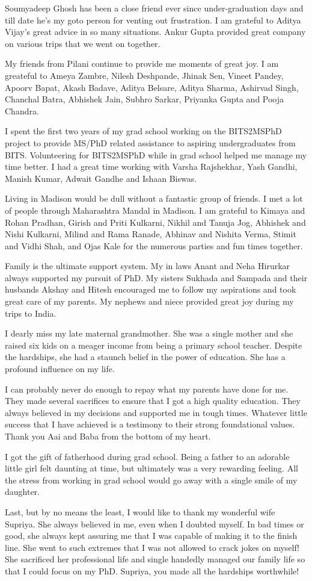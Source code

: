 Soumyadeep Ghosh has been a close friend ever since under-graduation days and till date he's my goto person for venting out frustration. 
I am grateful to Aditya Vijay's great advice in so many situations.
Ankur Gupta provided great company on various trips that we went on together.

My friends from Pilani continue to provide me moments of great joy.
I am greateful to Ameya Zambre, Nilesh Deshpande, Jhinak Sen, Vineet Pandey, Apoorv Bapat, Akash Badave, Aditya Belsare, Aditya Sharma, Ashirvad Singh, Chanchal Batra, Abhishek Jain, Subhro Sarkar, Priyanka Gupta and Pooja Chandra.

I spent the first two years of my grad school working on the BITS2MSPhD project to provide MS/PhD related assistance to aspiring undergraduates from BITS. 
Volunteering for BITS2MSPhD while in grad school helped me manage my time better.
I had a great time working with Varsha Rajshekhar, Yash Gandhi, Manish Kumar, Adwait Gandhe and Ishaan Biswas. 

Living in Madison would be dull without a fantastic group of friends.
I met a lot of people through Maharashtra Mandal in Madison. 
I am grateful to Kimaya and Rohan Pradhan, Girish and Priti Kulkarni, Nikhil and Tanuja Jog, Abhishek and Nishi Kulkarni, Milind and Rama Ranade, Abhinav and Nishita Verma, Stimit and Vidhi Shah, and Ojas Kale for the numerous parties and fun times together. 

Family is the ultimate support system. 
My in laws Anant and Neha Hirurkar always supported my pursuit of PhD. 
My sisters Sukhada and Sampada and their husbands Akshay and Hitesh encouraged me to follow my aspirations and took great care of my parents.
My nephews and niece provided great joy during my trips to India.

I dearly miss my late maternal grandmother. 
She was a single mother and she raised six kids on a meager income from being a primary school teacher.
Despite the hardships, she had a staunch belief in the power of education.
She has a profound influence on my life.

I can probably never do enough to repay what my parents have done for me. 
They made several sacrifices to ensure that I got a high quality education. 
They always believed in my decisions and supported me in tough times.
Whatever little success that I have achieved is a testimony to their strong foundational values.
Thank you Aai and Baba from the bottom of my heart.

I got the gift of fatherhood during grad school.
Being a father to an adorable little girl felt daunting at time, but ultimately was a very rewarding feeling.
All the stress from working in grad school would go away with a single smile of my daughter.

Last, but by no means the least, I would like to thank my wonderful wife Supriya. 
She always believed in me, even when I doubted myself. 
In bad times or good, she always kept assuring me that I was capable of making it to the finish line. 
She went to such extremes that I was not allowed to crack jokes on myself! 
She sacrificed her professional life and single handedly managed our family life so that I could focus on my PhD. 
Supriya, you made all the hardships worthwhile! 